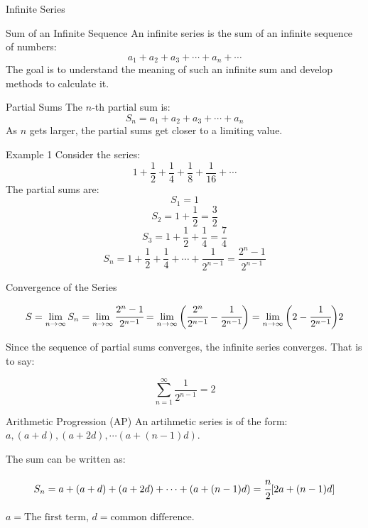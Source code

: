 \documentclass[aspectratio=169,xcolor=dvipsnames,svgnames,x11names,fleqn]{beamer}
\begin{document}
\begin{frame}{}
    \begin{center}
    \Huge \bf \color{DarkBlue}
    \faFire
    
    Infinite Series
\end{center}
\end{frame}


\begin{frame}{Sum of an Infinite Sequence}
An infinite series is the sum of an infinite sequence of numbers:
$$a_1 + a_2 + a_3 + \cdots + a_n + \cdots$$
The goal is to understand the meaning of such an infinite sum and develop methods to calculate it.
\end{frame}

\begin{frame}{Partial Sums}
The $n$-th partial sum is:
$$S_n = a_1 + a_2 + a_3 + \cdots + a_n$$
As $n$ gets larger, the partial sums get closer to a limiting value.
\end{frame}

\begin{frame}{Example 1}
Consider the series:
$$1 + \frac{1}{2} + \frac{1}{4} + \frac{1}{8} + \frac{1}{16} + \cdots$$
The partial sums are:
$$S_1 = 1$$
$$S_2 = 1 + \frac{1}{2} = \frac{3}{2}$$
$$S_3 = 1 + \frac{1}{2} + \frac{1}{4} = \frac{7}{4}$$
$$S_n = 1 + \frac{1}{2} + \frac{1}{4} + \cdots + \frac{1}{2^{n-1}} =  \frac{2^n - 1}{2^{n-1}}$$
\end{frame}

\begin{frame}{Convergence of the Series}

$$
S = \lim_{n \to \infty} S_n = \lim_{n\to \infty} \cfrac{2^n - 1}{2^{n-1}} =   \lim_{n \to \infty} \bigg (  \cfrac{2^n}{2^{n-1}} - \cfrac{1}{2^{n-1}}\bigg) =  \lim_{n \to \infty} \bigg( 2 - \cfrac{1}{2^{n-1}}\bigg) 2
$$

Since the sequence of partial sums converges, the infinite series converges. That is to say:

$$\sum_{n=1}^{\infty} \frac{1}{2^{n-1}} = 2$$
\end{frame}

\begin{frame}{Arithmetic Progression (AP)}
An artihmetic series is of the form: $a, (a+d), (a+2d), \cdots (a+(n-1)d)$.

The sum can be written as:

$$
S_n = a + (a+d)  + (a+2d) + \cdots +(a + (n-1)d) = \cfrac{n}{2}[2a + (n-1)d]
$$

$
a = \text{The first term}
$, $ d = \text{common difference}$.
\end{frame}
\end{document}
